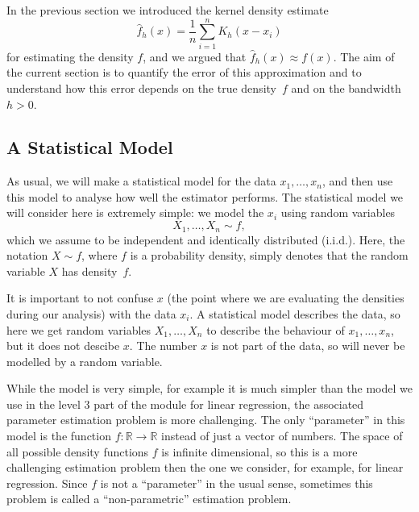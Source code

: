 \documentclass[
  a4paper,
]{article}
\theoremstyle{definition}
\theoremstyle{definition}
\theoremstyle{definition}
\theoremstyle{definition}
\theoremstyle{remark}
\begin{document}
In the previous section we introduced the kernel density estimate
\begin{equation}
  \hat f_h(x)
  = \frac{1}{n} \sum_{i=1}^n K_h(x - x_i)  \label{eq:KDE-est}
\end{equation}
for estimating the density \(f\), and we argued that \(\hat f_h(x) \approx f(x)\).
The aim of the current section is to quantify the error of this approximation
and to understand how this error depends on the true density~\(f\)
and on the bandwidth~\(h > 0\).

\subsection{A Statistical Model}\label{a-statistical-model}

As usual, we will make a statistical model for the data \(x_1, \ldots, x_n\),
and then use this model to analyse how well the estimator performs.
The statistical model we will consider here is extremely simple: we
model the \(x_i\) using random variables
\begin{equation}
  X_1, \ldots, X_n \sim f,  \label{eq:KDE-model}
\end{equation}
which we assume to be independent and identically distributed (i.i.d.).
Here, the notation \(X \sim f\), where \(f\) is a probability density, simply
denotes that the random variable \(X\) has density~\(f\).

It is important to not confuse \(x\) (the point where we are evaluating
the densities during our analysis) with the data \(x_i\). A statistical
model describes the data, so here we get random variables \(X_1, \ldots, X_n\)
to describe the behaviour of \(x_1, \ldots, x_n\), but it does not descibe \(x\).
The number \(x\) is not part of the data, so will never be modelled by a
random variable.

While the model is very simple, for example it is much simpler than the
model we use in the level 3 part of the module for linear regression,
the associated parameter estimation problem is more challenging.
The only ``parameter'' in this model is the function \(f \colon\mathbb{R}\to \mathbb{R}\)
instead of just a vector of numbers. The space of all possible density
functions \(f\) is infinite dimensional, so this is a more challenging
estimation problem then the one we consider, for example, for linear
regression. Since \(f\) is not a ``parameter'' in the usual sense, sometimes
this problem is called a ``non-parametric'' estimation problem.
\end{document}
